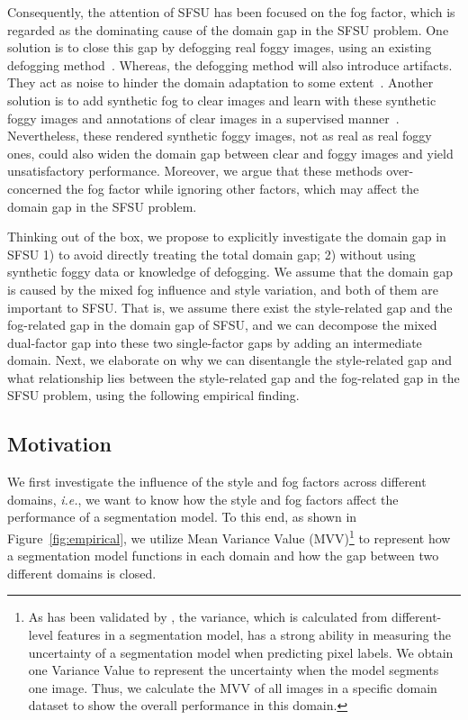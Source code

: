 \documentclass[10pt,twocolumn,letterpaper]{article}
\def\ie{\textit{i.e.}}
\begin{document}
Consequently, the attention of SFSU has been focused on the fog factor, 
which is regarded as the dominating cause of the domain gap in the SFSU problem. One solution is to close this gap by defogging real foggy images, using an existing defogging method~\cite{ren2018deep,de2019learning,zhang2018densely,ren2016single,he2010single,berman2016non,ren2018gated}.
Whereas, the defogging method will also introduce artifacts. They act as noise to hinder the domain adaptation to some extent~\cite{2018Does}. Another solution is to add synthetic fog to clear images and learn with these synthetic foggy images and annotations of clear images in a supervised manner~\cite{sakaridis2018model,sakaridis2018semantic,2019Purely,dai2020curriculum,gong2021analogical}. Nevertheless, these rendered synthetic foggy images, not as real as real foggy ones, could also widen the domain gap between clear and foggy images and yield unsatisfactory performance. Moreover, we argue that these methods over-concerned the fog factor while ignoring other factors, which may affect the domain gap in the SFSU problem.



Thinking out of the box, we propose to explicitly investigate the domain gap in SFSU 1) to avoid directly treating the total domain gap; 2) without using synthetic foggy data or knowledge of defogging. We assume that the domain gap is caused by the mixed fog influence and style variation, and both of them are important to SFSU. 
That is, we assume there exist the style-related gap and the fog-related gap in the domain gap of SFSU, and we can decompose the mixed dual-factor gap into these two single-factor gaps by adding an intermediate domain.
Next, we elaborate on why we can disentangle the style-related gap and what relationship lies between the style-related gap and the fog-related gap in the SFSU problem, using the following empirical finding.

\subsection{Motivation}
We first investigate the influence of the style and fog factors across different domains, \ie, we want to know how the style and fog factors affect the performance of a segmentation model. 
To this end, as shown in Figure~\ref{fig:empirical}, we utilize Mean Variance Value (MVV)\footnote{As has been validated by \cite{zheng2020unsupervised}, the variance, which is calculated from different-level features in a segmentation model, has a strong ability in measuring the uncertainty of a segmentation model when predicting pixel labels. We obtain one Variance Value to represent the uncertainty when the model segments one image. Thus, we calculate the MVV of all images in a specific domain dataset to show the overall performance in this domain.} 
to represent how a segmentation model functions in each domain and how the gap between two different domains is closed. 
\end{document}

